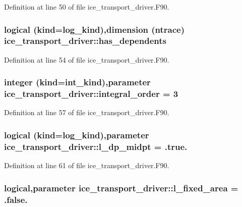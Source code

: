Definition at line 50 of file ice\_\-transport\_\-driver.F90.\hypertarget{namespaceice__transport__driver_a377931b1b7093fce2f15ea1930370cd1}{
\subsubsection[{has\_\-dependents}]{\setlength{\rightskip}{0pt plus 5cm}logical (kind=log\_\-kind),dimension ({\bf ntrace}) {\bf ice\_\-transport\_\-driver::has\_\-dependents}}}
\label{namespaceice__transport__driver_a377931b1b7093fce2f15ea1930370cd1}


Definition at line 54 of file ice\_\-transport\_\-driver.F90.\hypertarget{namespaceice__transport__driver_aeed35e7d53b7d7304b207337c111028b}{
\subsubsection[{integral\_\-order}]{\setlength{\rightskip}{0pt plus 5cm}integer (kind=int\_\-kind),parameter {\bf ice\_\-transport\_\-driver::integral\_\-order} = 3}}
\label{namespaceice__transport__driver_aeed35e7d53b7d7304b207337c111028b}


Definition at line 57 of file ice\_\-transport\_\-driver.F90.\hypertarget{namespaceice__transport__driver_a246442f9a224a039eee37618a4cc0751}{
\subsubsection[{l\_\-dp\_\-midpt}]{\setlength{\rightskip}{0pt plus 5cm}logical (kind=log\_\-kind),parameter {\bf ice\_\-transport\_\-driver::l\_\-dp\_\-midpt} = .true.}}
\label{namespaceice__transport__driver_a246442f9a224a039eee37618a4cc0751}


Definition at line 61 of file ice\_\-transport\_\-driver.F90.\hypertarget{namespaceice__transport__driver_ad4c977aa8b5dab5551cb2b87392ff8eb}{
\subsubsection[{l\_\-fixed\_\-area}]{\setlength{\rightskip}{0pt plus 5cm}logical,parameter {\bf ice\_\-transport\_\-driver::l\_\-fixed\_\-area} = .false.}}
\label{namespaceice__transport__driver_ad4c977aa8b5dab5551cb2b87392ff8eb}


